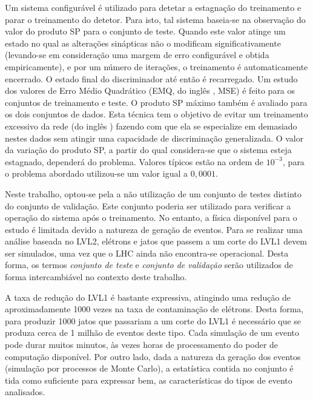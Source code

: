 Um sistema configurável é utilizado para detetar a estagnação do treinamento e
parar o treinamento do detetor. Para isto, tal sistema baseia-se na observação
do valor do produto SP para o conjunto de teste. Quando este valor atinge um
estado no qual as alterações sinápticas não o modificam significativamente
(levando-se em consideração uma margem de erro configurável e obtida
empiricamente), e por um número de iterações, o treinamento é automaticamente
encerrado. O estado final do discriminador até então é recarregado. Um estudo
dos valores de Erro Médio Quadrático (EMQ, do inglês ,
MSE) é feito para os conjuntos de treinamento e teste. O produto SP máximo
também é avaliado para os dois conjuntos de dados. Esta técnica tem o objetivo
de evitar um treinamento excessivo da rede (do inglês )
fazendo com que ela se especialize em demasiado nestes dados sem atingir uma
capacidade de discriminação generalizada. O valor da variação do produto SP, a
partir do qual considera-se que o sistema esteja estagnado, dependerá do
problema. Valores típicos estão na ordem de $10^{-3}$, para o problema
abordado utilizou-se um valor igual a $0,0001$.

Neste trabalho, optou-se pela a não utilização de um conjunto de testes
distinto do conjunto de validação. Este conjunto poderia ser utilizado para
verificar a operação do sistema após o treinamento. No entanto, a física
disponível para o estudo é limitada devido a natureza de geração de
eventos. Para se realizar uma análise baseada no LVL2, elétrons e jatos que
passem a um corte do LVL1 devem ser simulados, uma vez que o LHC ainda não
encontra-se operacional. Desta forma, os termos \textit{conjunto de teste} e
\textit{conjunto de validação} serão utilizados de forma intercambiável no
contexto deste trabalho.

A taxa de redução do LVL1 é bastante expressiva, atingindo uma redução de
aproximadamente 1000 vezes na taxa de contaminação de elétrons. Desta forma,
para produzir 1000 jatos que passariam a um corte do LVL1 é necessário que se
produza cerca de 1 milhão de eventos deste tipo. Cada simulação de um evento
pode durar muitos minutos, às vezes horas de processamento do poder de
computação disponível. Por outro lado, dada a natureza da geração dos eventos
(simulação por processos de Monte Carlo), a estatística contida no conjunto é
tida como suficiente para expressar bem, as características do tipos de evento
analisados.


